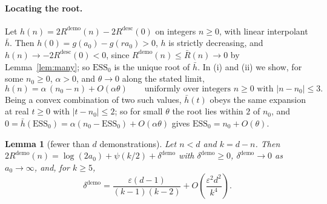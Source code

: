 \documentclass{article}
\newtheorem{lemma}[theorem]{Lemma}
\newcommand{\ess}{\mathrm{ESS}}
\begin{document}
\paragraph{Locating the root.}
Let $h(n) = 2R^{\mathrm{demo}}(n) - 2R^{\mathrm{desc}}(0)$ on integers $n \ge 0$, with linear interpolant $\bar h$. Then $h(0) = g(a_0) - g(r a_0) > 0$, $h$ is strictly decreasing, and $h(n) \to -2R^{\mathrm{desc}}(0) < 0$, since $R^{\mathrm{demo}}(n) \le \bar R(n) \to 0$ by Lemma~\ref{lem:many}; so $\ess_0$ is the unique root of $\bar h$. In (i) and (ii) we show, for some $n_0 \ge 0$, $\alpha > 0$, and $\theta \to 0$ along the stated limit,
\begin{equation}\label{eq:root}
h(n) = \alpha\,(n_0 - n) + O(\alpha\theta)
\qquad \text{uniformly over integers $n \ge 0$ with $|n - n_0| \le 3$.}
\end{equation}
Being a convex combination of two such values, $\bar h(t)$ obeys the same expansion at real $t \ge 0$ with $|t - n_0| \le 2$; so for small $\theta$ the root lies within $2$ of $n_0$, and $0 = \bar h(\ess_0) = \alpha(n_0 - \ess_0) + O(\alpha\theta)$ gives $\ess_0 = n_0 + O(\theta)$.

\begin{lemma}[fewer than $d$ demonstrations]\label{lem:few}
Let $n < d$ and $k = d - n$. Then $2R^{\mathrm{demo}}(n) = \log(2a_0) + \psi(k/2) + \delta^{\mathrm{demo}}$ with $\delta^{\mathrm{demo}} \ge 0$, $\delta^{\mathrm{demo}} \to 0$ as $a_0 \to \infty$, and, for $k \ge 5$,
\[
\delta^{\mathrm{demo}} = \frac{\varepsilon (d-1)}{(k-1)(k-2)} + O\!\left(\frac{\varepsilon^2 d^2}{k^4}\right).
\]
\end{lemma}
\end{document}
